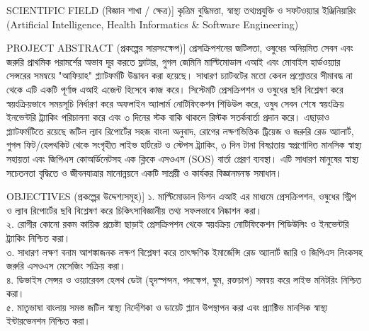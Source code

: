 \documentclass[12pt,a4paper,oneside]{report}
\begin{document}
\begin{highlightbox}[title=[FIELD 2] SCIENTIFIC FIELD (বিজ্ঞান শাখা / ক্ষেত্র)]
কৃত্রিম বুদ্ধিমত্তা, স্বাস্থ্য তথ্যপ্রযুক্তি ও সফটওয়্যার ইঞ্জিনিয়ারিং (Artificial Intelligence, Health Informatics \& Software Engineering)
\end{highlightbox}

\begin{highlightbox}[title=[FIELD 3] PROJECT ABSTRACT (প্রকল্পের সারসংক্ষেপ)]
প্রেসক্রিপশনের জটিলতা, ওষুধের অনিয়মিত সেবন এবং জরুরি প্রাথমিক পরামর্শের অভাব দূর করতে ফ্লাটার, গুগল জেমিনি মাল্টিমোডাল এআই এবং মোবাইল হার্ডওয়্যার সেন্সরের সমন্বয়ে "আফিয়াহ" প্ল্যাটফর্মটি উদ্ভাবন করা হয়েছে। সাধারণ চ্যাটবটের মতো কেবল প্রশ্নোত্তরে সীমাবদ্ধ না থেকে এটি একটি পূর্ণাঙ্গ এআই এজেন্ট হিসেবে কাজ করে। সিস্টেমটি প্রেসক্রিপশন ও ওষুধের ছবি বিশ্লেষণ করে স্বয়ংক্রিয়ভাবে সময়সূচি নির্ধারণ করে অফলাইন অ্যালার্ম নোটিফিকেশন শিডিউল করে, ওষুধ সেবন শেষে স্বয়ংক্রিয় ইনভেন্টরি ট্র্যাকিং পরিচালনা করে এবং ৩ দিনের স্টক বাকি থাকলে রিস্টক সতর্কবার্তা প্রদান করে। এছাড়াও প্ল্যাটফর্মটিতে রয়েছে জটিল ল্যাব রিপোর্টের সহজ বাংলা অনুবাদ, রোগের লক্ষণভিত্তিক ট্রিয়েজ ও জরুরি রেড অ্যালার্ট, গুগল ফিট/হেলথকিট থেকে সংগৃহীত লাইভ হার্টরেট ও স্টেপস ট্র্যাকিং, ৩ দিন টানা বিষণ্ণতায় স্বপ্রণোদিত মানসিক স্বাস্থ্য সহায়তা এবং জিপিএস কোঅর্ডিনেটসহ এক ক্লিকে এসওএস (SOS) বার্তা প্রেরণ ব্যবস্থা। এটি সাধারণ মানুষের স্বাস্থ্য সচেতনতা বৃদ্ধিতে ও জীবনযাত্রার মানোন্নয়নে একটি সাশ্রয়ী ও কার্যকর বিজ্ঞানমনস্ক সমাধান।
\end{highlightbox}

\begin{highlightbox}[title=[FIELD 4] OBJECTIVES (প্রকল্পের উদ্দেশ্যসমূহ)]
১. মাল্টিমোডাল ভিশন এআই এর মাধ্যমে প্রেসক্রিপশন, ওষুধের স্ট্রিপ ও ল্যাব রিপোর্টের ছবি বিশ্লেষণ করে চিকিৎসাবিজ্ঞানীয় তথ্য সফলভাবে নিষ্কাশন করা।\\
২. রোগীর কোনো রকম কায়িক প্রচেষ্টা ছাড়াই প্রেসক্রিপশন থেকে স্বয়ংক্রিয় নোটিফিকেশন শিডিউলিং ও ইনভেন্টরি ট্র্যাকিং নিশ্চিত করা।\\
৩. সাধারণ লক্ষণ বনাম আশঙ্কাজনক লক্ষণ বিশ্লেষণ করে তাৎক্ষণিক ইমার্জেন্সি রেড অ্যালার্ট জারি ও জিপিএস লিংকসহ জরুরি এসওএস মেসেজিং সক্রিয় করা।\\
৪. ডিভাইস সেন্সর ও ওয়্যারেবল হেলথ ডেটা (হৃদস্পন্দন, পদক্ষেপ, ঘুম, রক্তচাপ) সমন্বয় করে লাইভ মনিটরিং নিশ্চিত করা।\\
৫. মাতৃভাষা বাংলায় সমস্ত জটিল স্বাস্থ্য নির্দেশিকা ও ডায়েট প্ল্যান উপস্থাপন করা এবং প্র্যাক্টিভ মানসিক স্বাস্থ্য ইন্টারভেনশন নিশ্চিত করা।
\end{highlightbox}
\end{document}
